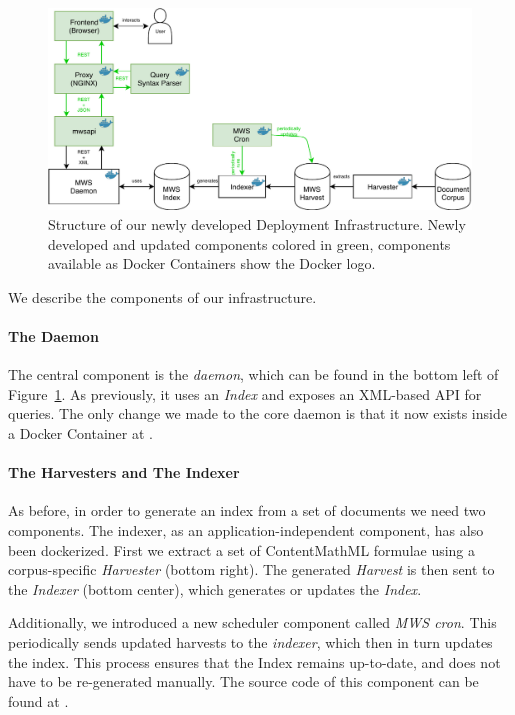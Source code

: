 \begin{figure}[ht]
  \includegraphics[width=1.0\textwidth]{mws_layout.pdf}
  \caption{Structure of our newly developed \MWS Deployment Infrastructure. Newly developed and updated components colored in green, components available as Docker Containers show the Docker logo.  }\label{fig:mwsdeployment}
\end{figure}

We describe the components of our infrastructure. 

\paragraph{The \MWS Daemon}
The central component is the \textit{\MWS daemon}, which can be found in the bottom left of Figure~\ref{fig:mwsdeployment}. 
As previously, it uses an \textit{Index} and exposes an XML-based API for queries. 
The only change we made to the core daemon is that it now exists inside a Docker Container at \cite{mwsdocker:on}.

\paragraph{The Harvesters and The Indexer}
As before, in order to generate an index from a set of documents we need two components. 
The indexer, as an application-independent component, has also been dockerized\cite{mwsindexer:github:on}. 
First we extract a set of ContentMathML formulae using a corpus-specific \textit{Harvester} (bottom right). 
The generated \textit{Harvest} is then sent to the \textit{Indexer} (bottom center), which generates or updates the \textit{Index}. 

Additionally, we introduced a new scheduler component called \textit{MWS cron}. 
This periodically sends updated harvests to the \textit{indexer}, which then in turn updates the index. 
This process ensures that the Index remains up-to-date, and does not have to be re-generated manually. 
The source code of this component can be found at \cite{mwscron:github:on}. 

